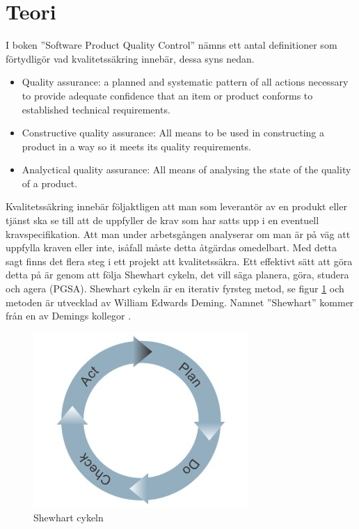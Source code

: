 \section{Teori}
I boken ''Software Product Quality Control'' \cite{SPQC} nämns ett antal definitioner som förtydligör vad kvalitetssäkring innebär, dessa syns nedan.  

\begin{itemize}
  \item Quality assurance: a planned and systematic pattern of all actions necessary to provide adequate confidence that an item or product conforms to established technical requirements. 
  \item Constructive quality assurance: All means to be used in constructing a product in a way so it  meets its quality requirements. 
  \item Analyctical quality assurance: All means of analysing the state of the quality of a product. 
\end{itemize}
\noindent Kvalitetssäkring innebär följaktligen att man som leverantör av en produkt eller tjänst ska se till att de uppfyller de krav som har satts upp i en eventuell kravspecifikation. Att man under arbetsgången analyserar om man är på väg att uppfylla kraven eller inte, isåfall måste detta åtgärdas omedelbart.
\newline
\newline
Med detta sagt finns det flera steg i ett projekt att kvalitetssäkra. Ett effektivt sätt att göra detta på är genom att följa Shewhart cykeln, det vill säga planera, göra, studera och agera (PGSA). Shewhart cykeln är en iterativ fyrsteg metod, se figur \ref{fig:shewcycle} och metoden är utvecklad av William Edwards Deming. Namnet ''Shewhart'' kommer från en av Demings kollegor \cite[p.~88]{Deming}. 

\begin{figure}[h]
\centerline{\includegraphics[scale=0.5]{ruben-tex/graphic/shewhartcycle}}
\caption{Shewhart cykeln}
\label{fig:shewcycle}
\end{figure}

